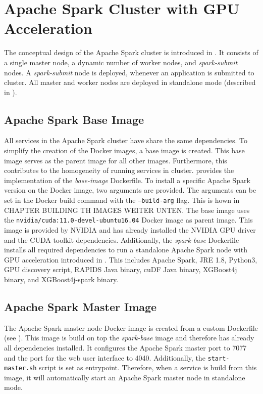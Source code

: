 \section{Apache Spark Cluster with GPU Acceleration}
The conceptual design of the Apache Spark cluster is introduced in . It consists of a single master node, a dynamic number of worker nodes, and \textit{spark-submit} nodes. A \textit{spark-submit} node is deployed, whenever an application is submitted to cluster.
All master and worker nodes are deployed in standalone mode (described in ).


\subsection{Apache Spark Base Image}
All services in the Apache Spark cluster have share the same dependencies. To simplify the creation of the Docker images, a base image is created. This base image serves as the parent image for all other images. Furthermore, this contributes to the homogeneity of running services in cluster.
%
 provides the implementation of the \textit{base-image} Dockerfile.
%
To install a specific Apache Spark version on the Docker image, two arguments are provided. The arguments can be set in the Docker build command with the \texttt{--build-arg} flag. This is hown in CHAPTER BUILDING TH IMAGES WEITER UNTEN.
%
The base image uses the \texttt{nvidia/cuda:11.0-devel-ubuntu16.04} Docker image as parent image. This image is provided by NVIDIA and has already installed the NVIDIA GPU driver and the CUDA toolkit dependencies.
%
Additionally, the \textit{spark-base} Dockerfile installs all required dependencies to run a standalone Apache Spark node with GPU acceleration introduced in . This includes Apache Spark, JRE 1.8, Python3, GPU discovery script, RAPIDS Java binary, cuDF Java binary, XGBoost4j binary, and XGBoost4j-spark binary.


\subsection{Apache Spark Master Image}
The Apache Spark master node Docker image is created from a custom Dockerfile (see ).
This image is build on top the \textit{spark-base} image and therefore has already all dependencies installed.
It configures the Apache Spark master port to 7077 and the port for the web user interface to 4040.
Additionally, the \texttt{start-master.sh} script is set as entrypoint. Therefore, when a service is build from this image, it will automatically start an Apache Spark master node in standalone mode.


